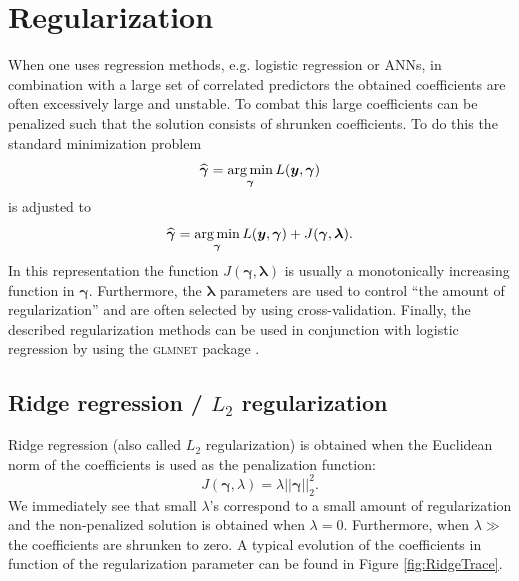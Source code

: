 \section{Regularization}
\label{sec:Regularization}
When one uses regression methods, e.g. logistic regression or ANNs, in combination with a large set of correlated predictors the obtained coefficients are often excessively large and unstable. To combat this large coefficients can be penalized such that the solution consists of shrunken coefficients. To do this the standard minimization problem
\[\widehat{\bm{\gamma}} = \operatorname*{arg\,min}_{\bm{\gamma}} L(\bm{y},\bm{\gamma})\]
is adjusted to 
\begin{equation}
\label{eq:regularization}
\widehat{\bm{\gamma}} = \operatorname*{arg\,min}_{\bm{\gamma}} L(\bm{y},\bm{\gamma}) + J(\bm{\gamma},\bm{\lambda}).
\end{equation}
In this representation the function $ J(\bm{\gamma},\bm{\lambda})$ is usually a monotonically increasing function in $\bm{\gamma}$. Furthermore, the $\bm{\lambda}$ parameters are used to control ``the amount of regularization'' and are often selected by using cross-validation. Finally, the described regularization methods can be used in conjunction with logistic regression by using the \textsc{glmnet} package \parencite{glmnet}.

\label{sec:Regularization}
\subsection{Ridge regression / $L_2$ regularization}
\label{sec:L2Regularization}
Ridge regression (also called $L_2$ regularization) is obtained when the Euclidean norm of the coefficients is used as the penalization function:
\[J(\bm{\gamma},\lambda) = \lambda \vert \vert \bm{\gamma} \vert \vert ^2 _2.\]
We immediately see that small $\lambda$'s correspond to a small amount of regularization and the non-penalized solution is obtained when $\lambda = 0.$ Furthermore, when $\lambda \gg$ the coefficients are shrunken to zero. A typical evolution of the coefficients in function of the regularization parameter can be found in Figure \ref{fig:RidgeTrace}.\\ 

